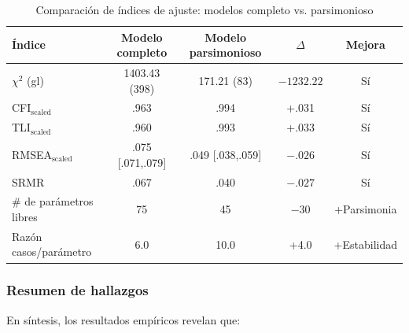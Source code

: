 \begin{table}[htbp]
\centering
\caption{Comparación de índices de ajuste: modelos completo vs. parsimonioso}
\label{tab:comparacion-modelos}
\small
\begin{tabular}{@{}lcccc@{}}
\toprule
\textbf{Índice} & \textbf{Modelo completo} & \textbf{Modelo parsimonioso} & \textbf{$\Delta$} & \textbf{Mejora} \\
\midrule
$\chi^2$ (gl)               & 1403.43 (398)  & 171.21 (83)    & $-1232.22$ & Sí \\
CFI$_{\text{scaled}}$       & .963           & .994          & +.031     & Sí \\
TLI$_{\text{scaled}}$       & .960           & .993          & +.033     & Sí \\
RMSEA$_{\text{scaled}}$     & .075 [.071,.079] & .049 [.038,.059] & $-.026$ & Sí \\
SRMR                        & .067           & .040          & $-.027$ & Sí \\
\# de parámetros libres     & 75             & 45            & $-30$   & +Parsimonia \\
Razón casos/parámetro       & 6.0            & 10.0          & +4.0    & +Estabilidad \\
\bottomrule
\end{tabular}
\end{table}

\subsubsection*{Resumen de hallazgos}
En síntesis, los resultados empíricos revelan que:

